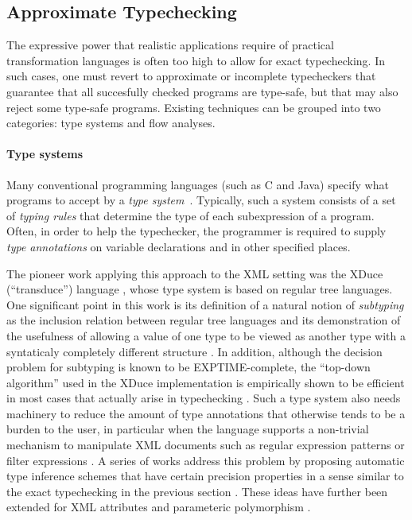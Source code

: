 \documentclass[twoside,leqno,onecolumn,pdftex]{article}
\begin{document}
\begin{scientific}
\subsection*{Approximate Typechecking}

The expressive power that realistic applications
require of practical transformation languages is often too high to
allow for exact typechecking. In such cases, one must revert to
approximate or incomplete typecheckers that guarantee that all
succesfully checked programs are type-safe, but that may also reject
some type-safe programs. Existing techniques can be grouped into two
categories: type systems and flow analyses.

\paragraph{Type systems}

Many conventional programming languages (such as C and Java) specify
what programs to accept by a {\em type
  system}~\cite{pierce:types-proglang}.  Typically, such a system
consists of a set of {\em typing rules} that determine the type of
each subexpression of a program.  Often, in order to help the typechecker,
the programmer is required to supply {\em type
  annotations} on variable declarations and in other specified places.

The pioneer work applying this approach to the XML setting was the
XDuce (``transduce'') language \cite{HosoyaPierceTOIT03},
whose type system is based on regular tree languages.  One significant point
in this work is its definition of a natural notion of {\em subtyping}
as the inclusion relation between regular tree languages and
its demonstration of the usefulness of allowing a value of one
type to be viewed as another type with a syntaticaly completely
different structure \cite{HVPRegtypeToplas}.  In addition, although
the decision problem for subtyping is known to be EXPTIME-complete,
the ``top-down algorithm'' used in the XDuce implementation is
empirically shown to be efficient
in most cases that actually arise in typechecking
\cite{HVPRegtypeToplas,SudaHosoya05,jacm08}.  Such a type system
also needs machinery to reduce the amount of type annotations that
otherwise tends to be a burden to the user, in particular when the
language supports a non-trivial mechanism to manipulate XML documents
such as regular expression patterns \cite{HosoyaPierceRegpatJFP} or
filter expressions \cite{HosoyaFiltersJFP}.  A series of works
address this problem by proposing automatic type inference schemes
that have certain precision properties in a sense similar to the exact
typechecking in the previous section
\cite{HosoyaPierceRegpatJFP,HosoyaFiltersJFP,VouillonPLANX06}.  These
ideas have further been extended for XML attributes
\cite{HosoyaMurataTCS06} and parameteric polymorphism
\cite{HosoyaFrischCastagna05POPL,VouillonPOPL06}.


\end{scientific}
\end{document}

